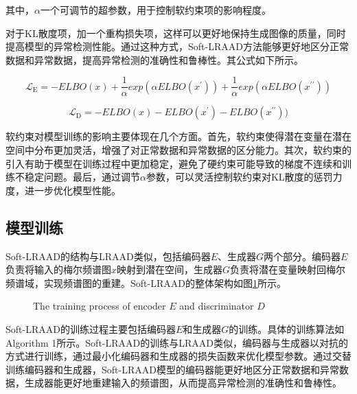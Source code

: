 \documentclass{article}
\begin{document}
其中，$\alpha$一个可调节的超参数，用于控制软约束项的影响程度。

对于KL散度项，加一个重构损失项，这样可以更好地保持生成图像的质量，同时提高模型的异常检测性能。通过这种方式，Soft-LRAAD方法能够更好地区分正常数据和异常数据，提高异常检测的准确性和鲁棒性。其公式如下所示。

\begin{equation} \label{eq:encoder_loss}
  \mathcal{L}_{\mathrm{E}}=-ELBO(x) + \frac{1}{\alpha}exp(\alpha ELBO(x^\prime)) + \frac{1}{\alpha}exp(\alpha ELBO(x^{\prime\prime}))
\end{equation}

\begin{equation} \label{eq:decoder_loss}
  \mathcal{L}_{\text {D}}=-ELBO(x) - ELBO(x^\prime) - ELBO(x^{\prime\prime}))
\end{equation}

软约束对模型训练的影响主要体现在几个方面。首先，软约束使得潜在变量在潜在空间中分布更加灵活，增强了对正常数据和异常数据的区分能力。其次，软约束的引入有助于模型在训练过程中更加稳定，避免了硬约束可能导致的梯度不连续和训练不稳定问题。最后，通过调节$\alpha$参数，可以灵活控制软约束对KL散度的惩罚力度，进一步优化模型性能。

\subsection{模型训练}

Soft-LRAAD的结构与LRAAD类似，包括编码器$E$、生成器$G$两个部分。编码器$E$负责将输入的梅尔频谱图$x$映射到潜在空间，生成器$G$负责将潜在变量映射回梅尔频谱域，实现频谱图的重建。Soft-LRAAD的整体架构如图\ref{fig:soft_lraad}所示。

\begin{figure}[H]
    \centering
    \def\svgwidth{\textwidth}
    
    \caption{The training process of encoder $E$ and discriminator $D$}
    \label{fig:soft_lraad}
\end{figure}


Soft-LRAAD的训练过程主要包括编码器$E$和生成器$G$的训练。具体的训练算法如Algorithm 1所示。Soft-LRAAD的训练与LRAAD类似，编码器与生成器以对抗的方式进行训练，通过最小化编码器和生成器的损失函数来优化模型参数。通过交替训练编码器和生成器，Soft-LRAAD模型的编码器能更好地区分正常数据和异常数据，生成器能更好地重建输入的频谱图，从而提高异常检测的准确性和鲁棒性。
\end{document}
